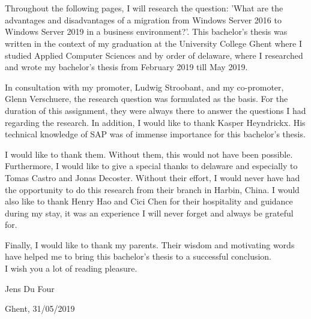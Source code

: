 
\chapter*{}
\label{ch:voorwoord}

Throughout the following pages, I will research the question: 'What are the advantages and disadvantages of a migration from Windows Server 2016 to Windows Server 2019 in a business environment?'. 
This bachelor's thesis was written in the context of my graduation at the University College Ghent where I studied Applied Computer Sciences and by order of delaware, where I researched and wrote my bachelor's thesis from February 2019 till May 2019.

In consultation with my promoter, Ludwig Stroobant, and my co-promoter, Glenn Verschuere, the research question was formulated as the basis. 
For the duration of this assignment, they were always there to answer the questions I had regarding the research. 
In addition, I would like to thank Kasper Heyndrickx. 
His technical knowledge of SAP was of immense importance for this bachelor's thesis.

I would like to thank them. 
Without them, this would not have been possible.
Furthermore, I would like to give a special thanks to delaware and especially to Tomas Castro and Jonas Decoster. 
Without their effort, I would never have had the opportunity to do this research from their branch in Harbin, China.
I would also like to thank Henry Hao and Cici Chen for their hospitality and guidance during my stay, it was an experience I will never forget and always be grateful for. 

Finally, I would like to thank my parents. Their wisdom and motivating words have helped me to bring this bachelor's thesis to a successful conclusion.\\
I wish you a lot of reading pleasure.

Jens Du Four

Ghent, 31/05/2019